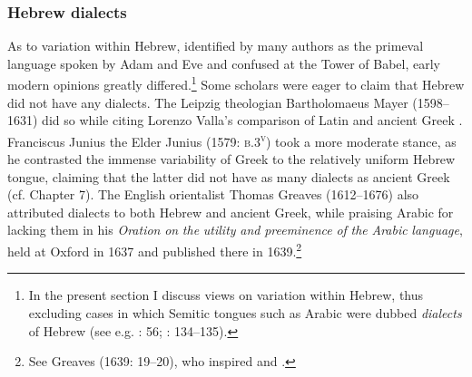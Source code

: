 \subsubsection{Hebrew dialects}
\hypertarget{Toc19704866}{}
As to variation within Hebrew, identified by many authors as the primeval language spoken by Adam and Eve and confused at the Tower of Babel, early modern opinions greatly differed.\footnote{In the present section I discuss views on variation within Hebrew, thus excluding cases in which Semitic tongues such as Arabic were dubbed \textit{dialects} of Hebrew (see e.g. \citealt{Bochart1646}: 56; \citealt{Martin1737}: 134–135).} Some scholars were eager to claim that Hebrew did not have any dialects. The Leipzig theologian Bartholomaeus Mayer (1598–1631) did so while citing Lorenzo Valla’s comparison of Latin and ancient Greek \citep[10]{Mayer1629}. Franciscus Junius the Elder Junius (1579: \textsc{b.3}\textsc{\textsuperscript{v}}) took a more moderate stance, as he contrasted the immense variability of Greek to the relatively uniform Hebrew tongue, claiming that the latter did not have as many dialects as ancient Greek (cf. Chapter 7). The English orientalist Thomas Greaves (1612–1676) also attributed dialects to both Hebrew and ancient Greek, while praising Arabic for lacking them in his \textit{Oration} \textit{on} \textit{the} \textit{utility} \textit{and} \textit{preeminence} \textit{of} \textit{the} \textit{Arabic} \textit{language}, held at Oxford in 1637 and published there in 1639.\footnote{See Greaves (1639: 19–20), who inspired \citet[60]{Leigh1656} and \citet[73]{Blount1680}.}


